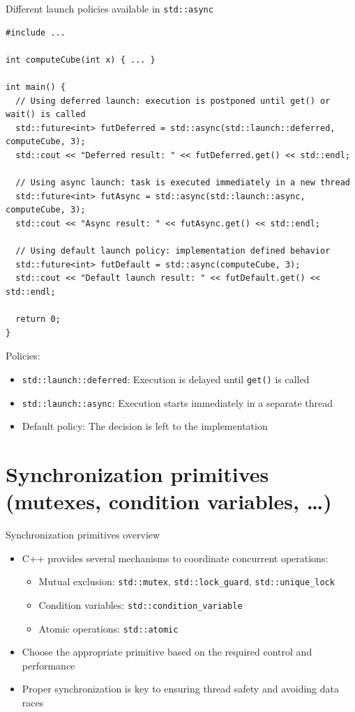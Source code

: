 \documentclass{beamer}
\begin{document}
\begin{frame}[fragile]{Different launch policies available in \texttt{std::async}}
  \lstset{style=CStyle}
  \begin{lstlisting}
#include ...

int computeCube(int x) { ... }

int main() {
  // Using deferred launch: execution is postponed until get() or wait() is called
  std::future<int> futDeferred = std::async(std::launch::deferred, computeCube, 3);
  std::cout << "Deferred result: " << futDeferred.get() << std::endl;
  
  // Using async launch: task is executed immediately in a new thread
  std::future<int> futAsync = std::async(std::launch::async, computeCube, 3);
  std::cout << "Async result: " << futAsync.get() << std::endl;
  
  // Using default launch policy: implementation defined behavior
  std::future<int> futDefault = std::async(computeCube, 3);
  std::cout << "Default launch result: " << futDefault.get() << std::endl;
  
  return 0;
}
  \end{lstlisting}
  Policies:
  \begin{itemize}
    \item \texttt{std::launch::deferred}: Execution is delayed until \texttt{get()} is called
    \item \texttt{std::launch::async}: Execution starts immediately in a separate thread
    \item Default policy: The decision is left to the implementation
  \end{itemize}
\end{frame}

\section{Synchronization primitives (mutexes, condition variables, \dots)}

\begin{frame}{Synchronization primitives overview}
  \begin{itemize}
    \item C++ provides several mechanisms to coordinate concurrent operations:
      \begin{itemize}
        \item Mutual exclusion: \texttt{std::mutex}, \texttt{std::lock\_guard}, \texttt{std::unique\_lock}
        \item Condition variables: \texttt{std::condition\_variable}
        \item Atomic operations: \texttt{std::atomic}
      \end{itemize}
    \item Choose the appropriate primitive based on the required control and performance
    \item Proper synchronization is key to ensuring thread safety and avoiding data races
  \end{itemize}
\end{frame}
\end{document}
